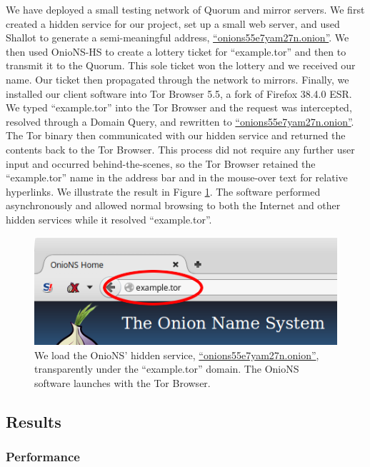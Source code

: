 \documentclass[USenglish,oneside,twocolumn]{article}
\begin{document}
We have deployed a small testing network of Quorum and mirror servers. We first created a hidden service for our project, set up a small web server, and used Shallot to generate a semi-meaningful address, \href{http://onions55e7yam27n.onion}{``onions55e7yam27n.onion''}. We then used OnioNS-HS to create a lottery ticket for ``example.tor'' and then to transmit it to the Quorum. This sole ticket won the lottery and we received our name. Our ticket then propagated through the network to mirrors. Finally, we installed our client software into Tor Browser 5.5, a fork of Firefox 38.4.0 ESR. We typed ``example.tor'' into the Tor Browser and the request was intercepted, resolved through a Domain Query, and rewritten to \href{http://onions55e7yam27n.onion}{``onions55e7yam27n.onion''}. The Tor binary then communicated with our hidden service and returned the contents back to the Tor Browser. This process did not require any further user input and occurred behind-the-scenes, so the Tor Browser retained the ``example.tor'' name in the address bar and in the mouse-over text for relative hyperlinks. We illustrate the result in Figure \ref{fig:prototypeExample}. The software performed asynchronously and allowed normal browsing to both the Internet and other hidden services while it resolved ``example.tor''.

\begin{figure}[h]
	\centering
	\includegraphics[width=\linewidth]{../assets/images/example.png}
	\caption{We load the OnioNS' hidden service, \href{http://onions55e7yam27n.onion}{``onions55e7yam27n.onion''}, transparently under the ``example.tor'' domain. The OnioNS software launches with the Tor Browser.}
	\label{fig:prototypeExample}
\end{figure}

\subsection{Results}

\subsubsection{Performance} %
\end{document}
